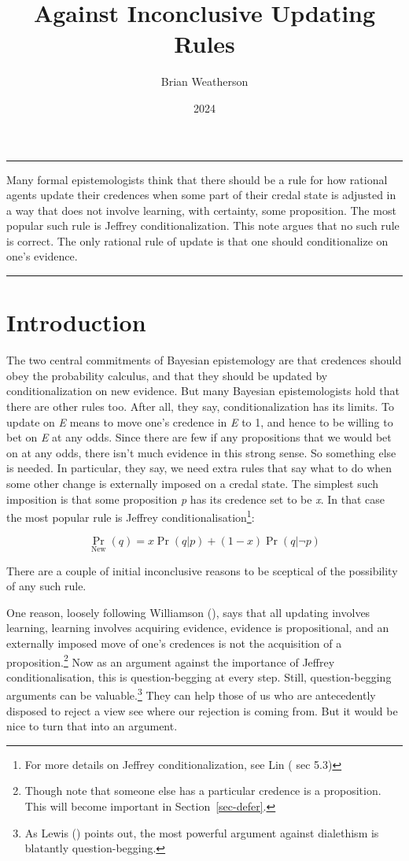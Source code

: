 \documentclass[
  10pt,
  letterpaper,
  DIV=11,
  numbers=noendperiod,
  twoside]{scrartcl}
\title{Against Inconclusive Updating Rules}
\author{Brian Weatherson}
\date{2024}
\renewenvironment{abstract}
 {\vspace{-1.25cm}
 \quotation\small\noindent\rule{\linewidth}{.5pt}\par\smallskip
 \noindent }
 {\par\noindent\rule{\linewidth}{.5pt}\endquotation}
\begin{document}
\maketitle
\begin{abstract}
Many formal epistemologists think that there should be a rule for how
rational agents update their credences when some part of their credal
state is adjusted in a way that does not involve learning, with
certainty, some proposition. The most popular such rule is Jeffrey
conditionalization. This note argues that no such rule is correct. The
only rational rule of update is that one should conditionalize on one's
evidence.
\end{abstract}


\section{Introduction}\label{sec-intro}

The two central commitments of Bayesian epistemology are that credences
should obey the probability calculus, and that they should be updated by
conditionalization on new evidence. But many Bayesian epistemologists
hold that there are other rules too. After all, they say,
conditionalization has its limits. To update on \emph{E} means to move
one's credence in \emph{E} to 1, and hence to be willing to bet on
\emph{E} at any odds. Since there are few if any propositions that we
would bet on at any odds, there isn't much evidence in this strong
sense. So something else is needed. In particular, they say, we need
extra rules that say what to do when some other change is externally
imposed on a credal state. The simplest such imposition is that some
proposition \emph{p} has its credence set to be \emph{x}. In that case
the most popular rule is Jeffrey conditionalisation\footnote{For more
  details on Jeffrey conditionalization, see Lin
  ( sec 5.3)}:

\[
\Pr_{\text{New}}(q) = x\Pr(q | p) + (1-x)\Pr(q | \neg p)
\]

There are a couple of initial inconclusive reasons to be sceptical of
the possibility of any such rule.

One reason, loosely following Williamson
(), says that all updating involves
learning, learning involves acquiring evidence, evidence is
propositional, and an externally imposed move of one's credences is not
the acquisition of a proposition.\footnote{Though note that someone else
  has a particular credence is a proposition. This will become important
  in Section~\ref{sec-defer}.} Now as an argument against the importance
of Jeffrey conditionalisation, this is question-begging at every step.
Still, question-begging arguments can be valuable.\footnote{As Lewis
  () points out, the most powerful
  argument against dialethism is blatantly question-begging.} They can
help those of us who are antecedently disposed to reject a view see
where our rejection is coming from. But it would be nice to turn that
into an argument.
\end{document}
